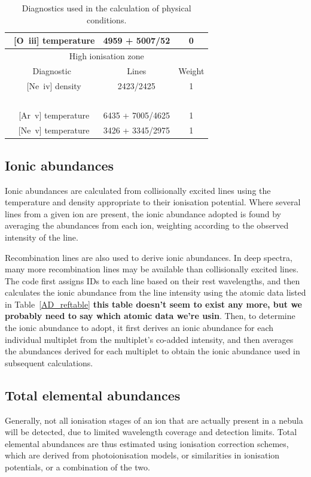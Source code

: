 \documentclass[useAMS,usenatbib]{mn2e}
\begin{document}
\begin{table}
\begin{tabular}{ccc}
~[O~{\sc iii}] temperature &4959 + 5007/52 & 0\\
\hline
\multicolumn{3}{c}{High ionisation zone}\\
\hline
Diagnostic & Lines & Weight \\
~[Ne~{\sc iv}] density & 2423/2425 & 1 \\
~\\
~[Ar~{\sc v}] temperature & 6435 + 7005/4625& 1 \\
~[Ne~{\sc v}] temperature & 3426 + 3345/2975 & 1 \\
\end{tabular}
\label{zonestable}
\caption{Diagnostics used in the calculation of physical conditions.}
\end{table}

\subsection{Ionic abundances}

Ionic abundances are calculated from collisionally excited lines using the temperature and density appropriate to their ionisation potential.  Where several lines from a given ion are present, the ionic abundance adopted is found by averaging the abundances from each ion, weighting according to the observed intensity of the line.

Recombination lines are also used to derive ionic abundances.  In deep spectra, many more recombination lines may be available than collisionally excited lines.  The code first assigns IDs to each line based on their rest wavelengths, and then calculates the ionic abundance from the line intensity using the atomic data listed in Table~\ref{AD_reftable} \textbf{this table doesn't seem to exist any more, but we probably need to say which atomic data we're usin}.  Then, to determine the ionic abundance to adopt, it first derives an ionic abundance for each individual multiplet from the multiplet's co-added intensity, and then averages the abundances derived for each multiplet to obtain the ionic abundance used in subsequent calculations.

\subsection{Total elemental abundances}

Generally, not all ionisation stages of an ion that are actually present in a nebula will be detected, due to limited wavelength coverage and detection limits.  Total elemental abundances are thus estimated using ionisation correction schemes, which are derived from photoionisation models, or similarities in ionisation potentials, or a combination of the two.
\end{document}
